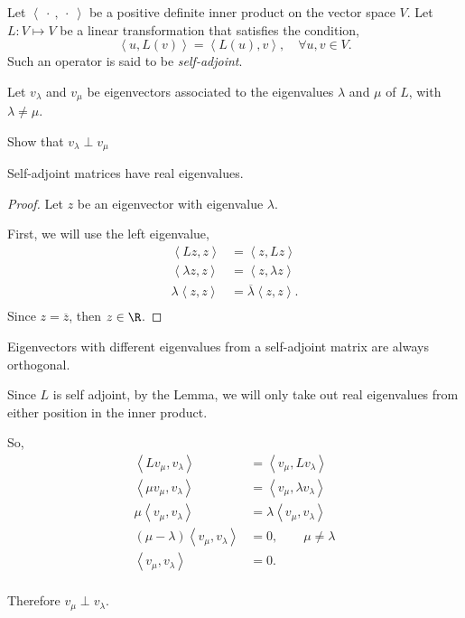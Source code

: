 \documentclass{article}
\begin{document}
\begin{problem}
  Let $\left<\: \cdot\:,\:\cdot\: \right>$ be a positive definite inner product on the vector space $V$. Let  $L:V \longmapsto V$ be a linear transformation that satisfies the condition,
  \[
  \left<u,L(v) \right> =\left<L(u),v \right>, \quad \forall u,v \in V 
  .\] 
  Such an operator is said to be \textit{self-adjoint}.

  Let $v_{\lambda}$ and  $v_{\mu}$ be eigenvectors associated to the eigenvalues  $\lambda$ and  $\mu$ of  $L$, with $\lambda\neq\mu$. 

  Show that $v_{\lambda}\perp v_{\mu}$
\end{problem}

\begin{lemma}
  Self-adjoint matrices have real eigenvalues.
\end{lemma}

\begin{proof}
  Let $z$ be an eigenvector with eigenvalue $\lambda$.

  First, we will use the left eigenvalue,
  \begin{align*}
    \left<Lz,z\right> &= \left<z,Lz \right> \\
    \left< \lambda z,z \right>&= \left< z, \lambda z \right> \\
    \lambda \left< z,z \right> &= \overline{\lambda}\left<z,z \right>. \\
  \end{align*}
  Since $z=\overline{z}$, then $z\in \R$.
\end{proof}

Eigenvectors with different eigenvalues from a self-adjoint matrix are always orthogonal.

Since $L$ is self adjoint, by the Lemma, we will only take out real eigenvalues from either position in the inner product. 

So,
\begin{align*}
  \left<Lv_{\mu},v_{\lambda}\right> &= \left<v_{\mu},Lv_{\lambda} \right> \\
  \left< \mu v_{\mu},v_{\lambda} \right>&= \left< v_{\mu}, \lambda v_{\lambda} \right> \\
  \mu\left< v_{\mu},v_{\lambda} \right>&= \lambda\left< v_{\mu}, v_{\lambda} \right> \\
  (\mu-\lambda)\left<v_{\mu},v_{\lambda} \right> &= 0, \qquad \mu\neq\lambda\\
  \left< v_{\mu},v_{\lambda}\right> &= 0. \\
\end{align*}

Therefore $v_{\mu}\perp v_{\lambda}$.
\end{document}

